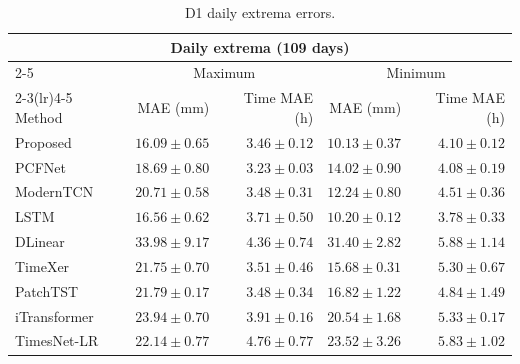 \begin{table}[H]
\centering
\caption{D1 daily extrema errors.}
\label{tab:d1_extrema_errors}
\manuscripttablestyle
\begin{tabular*}{\manuscripttablewidth}{@{\extracolsep{\fill}}lrrrr@{}}
\toprule
\multicolumn{5}{c}{Daily extrema (109 days)} \\
\cmidrule(lr){2-5}
 & \multicolumn{2}{c}{Maximum} & \multicolumn{2}{c}{Minimum} \\
\cmidrule(lr){2-3}\cmidrule(lr){4-5}
Method & MAE (mm) & Time MAE (h) & MAE (mm) & Time MAE (h) \\
\midrule
Proposed & $\mathbf{16.09\pm0.65}$ & $3.46\pm0.12$ & $\mathbf{10.13\pm0.37}$ & $4.10\pm0.12$ \\
PCFNet & $18.69\pm0.80$ & $\mathbf{3.23\pm0.03}$ & $14.02\pm0.90$ & $4.08\pm0.19$ \\
ModernTCN & $20.71\pm0.58$ & $3.48\pm0.31$ & $12.24\pm0.80$ & $4.51\pm0.36$ \\
LSTM & $16.56\pm0.62$ & $3.71\pm0.50$ & $10.20\pm0.12$ & $\mathbf{3.78\pm0.33}$ \\
DLinear & $33.98\pm9.17$ & $4.36\pm0.74$ & $31.40\pm2.82$ & $5.88\pm1.14$ \\
TimeXer & $21.75\pm0.70$ & $3.51\pm0.46$ & $15.68\pm0.31$ & $5.30\pm0.67$ \\
PatchTST & $21.79\pm0.17$ & $3.48\pm0.34$ & $16.82\pm1.22$ & $4.84\pm1.49$ \\
iTransformer & $23.94\pm0.70$ & $3.91\pm0.16$ & $20.54\pm1.68$ & $5.33\pm0.17$ \\
TimesNet-LR & $22.14\pm0.77$ & $4.76\pm0.77$ & $23.52\pm3.26$ & $5.83\pm1.02$ \\
\bottomrule
\end{tabular*}

\end{table}

